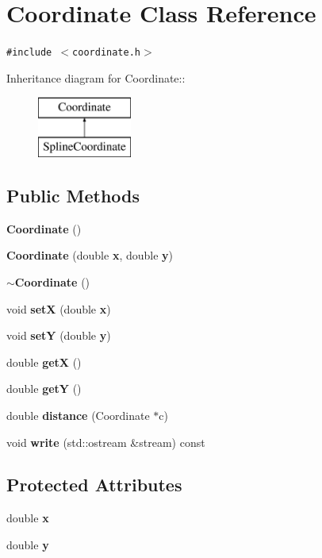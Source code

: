 \section{Coordinate Class Reference}
\label{classCoordinate}
{\tt \#include $<$coordinate.h$>$}

Inheritance diagram for Coordinate::\begin{figure}[H]
\begin{center}
\leavevmode
\includegraphics[height=2cm]{classCoordinate}
\end{center}
\end{figure}
\subsection*{Public Methods}
\begin{CompactItemize}
\item 
{\bf Coordinate} ()
\item 
{\bf Coordinate} (double {\bf x}, double {\bf y})
\item 
{\bf $\sim$Coordinate} ()
\item 
void {\bf set\-X} (double {\bf x})
\item 
void {\bf set\-Y} (double {\bf y})
\item 
double {\bf get\-X} ()
\item 
double {\bf get\-Y} ()
\item 
double {\bf distance} (Coordinate $\ast$c)
\item 
void {\bf write} (std::ostream \&stream) const
\end{CompactItemize}
\subsection*{Protected Attributes}
\begin{CompactItemize}
\item 
double {\bf x}
\item 
double {\bf y}
\end{CompactItemize}


